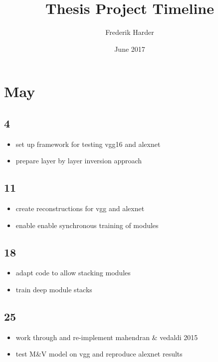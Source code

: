 \documentclass{article}
\title{Thesis Project Timeline}
\author{Frederik Harder}
\date{June 2017}
\begin{document}
	
\maketitle

\section*{May}

\subsection*{4}

\begin{itemize}
	\item set up framework for testing vgg16 and alexnet
	\item prepare layer by layer inversion approach
\end{itemize}

\subsection*{11}

\begin{itemize}
	\item  create reconstructions for vgg and alexnet
	\item enable enable synchronous training of modules
\end{itemize}

\subsection*{18}

\begin{itemize}
	\item  adapt code to allow stacking modules
	\item train deep module stacks
\end{itemize}

\subsection*{25}

\begin{itemize}
	\item  work through and re-implement mahendran \& vedaldi 2015
	\item  test M\&V model on vgg and reproduce alexnet results
\end{itemize}
\end{document}
